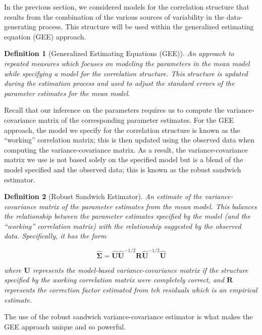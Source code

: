 \documentclass[
]{book}
\theoremstyle{plain}
\theoremstyle{mydefn}
\newtheorem{definition}{Definition}[chapter]
\theoremstyle{myexmpl}
\theoremstyle{remark}
\begin{document}
In the previous section, we considered models for the correlation structure that results from the combination of the various sources of variability in the data-generating process. This structure will be used within the generalized estimating equation (GEE) approach.

\begin{definition}[Generalized Estimating Equations (GEE)]
An approach to repeated measures which focuses on modeling the parameters in the mean model while specifying a model for the correlation structure. This structure is updated during the estimation process and used to adjust the standard errors of the parameter estimates for the mean model.
\end{definition}

Recall that our inference on the parameters requires us to compute the variance-covariance matrix of the corresponding parameter estimates. For the GEE approach, the model we specify for the correlation structure is known as the ``working'' correlation matrix; this is then updated using the observed data when computing the variance-covariance matrix. As a result, the variance-covariance matrix we use is not based solely on the specified model but is a blend of the model specified and the observed data; this is known as the robust sandwich estimator.

\begin{definition}[Robust Sandwich Estimator]
An estimate of the variance-covariance matrix of the parameter estimates from the mean model. This balances the relationship between the parameter estimates specified by the model (and the ``working'' correlation matrix) with the relationship suggested by the observed data. Specifically, it has the form

\[\widehat{\boldsymbol{\Sigma}} = \widehat{\mathbf{U}} \widehat{\mathbf{U}}^{-1/2} \mathbf{R} \widehat{\mathbf{U}}^{-1/2} \widehat{\mathbf{U}}\]

where \(\mathbf{U}\) represents the model-based variance-covariance matrix if the structure specified by the working correlation matrix were completely correct, and \(\mathbf{R}\) represents the correction factor estimated from teh residuals which is an empirical estimate.
\end{definition}

\begin{rmdkeyidea}
The use of the robust sandwich variance-covariance estimator is what makes the GEE approach unique and so powerful.
\end{rmdkeyidea}
\end{document}

